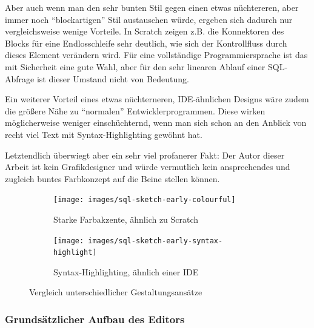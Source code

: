 
Aber auch wenn man den sehr bunten Stil gegen einen etwas nüchtereren, aber immer noch ``blockartigen'' Stil austauschen würde, ergeben sich dadurch nur vergleichsweise wenige Vorteile. In Scratch zeigen z.B. die Konnektoren des Blocks für eine Endlosschleife sehr deutlich, wie sich der Kontrollfluss durch dieses Element verändern wird. Für eine vollständige Programmiersprache ist das mit Sicherheit eine gute Wahl, aber für den sehr linearen Ablauf einer SQL-Abfrage ist dieser Umstand nicht von Bedeutung.

Ein weiterer Vorteil eines etwas nüchterneren, IDE-ähnlichen Designs wäre zudem die größere Nähe zu ``normalen'' Entwicklerprogrammen. Diese wirken möglicherweise weniger einschüchternd, wenn man sich schon an den Anblick von recht viel Text mit Syntax-Highlighting gewöhnt hat.

Letztendlich überwiegt aber ein sehr viel profanerer Fakt: Der Autor dieser Arbeit ist kein Grafikdesigner und würde vermutlich kein ansprechendes und zugleich buntes Farbkonzept auf die Beine stellen können.

\begin{figure}
  \begin{subfigure}[b]{0.45\textwidth}
    \texttt{[image: images/sql-sketch-early-colourful]}
    \caption{Starke Farbakzente, ähnlich zu Scratch}
    \label{fig:screen-sql-editor-early-colourful}
  \end{subfigure}\hfill
  \begin{subfigure}[b]{0.45\textwidth}
    \texttt{[image: images/sql-sketch-early-syntax-highlight]}
    \caption{Syntax-Highlighting, ähnlich einer IDE}
    \label{fig:screen-sql-editor-early-syntax-highlighting}
  \end{subfigure}
  \caption{Vergleich unterschiedlicher Gestaltungsansätze}
  \label{fig:compare-colourful}
\end{figure}

\subsubsection{Grundsätzlicher Aufbau des Editors}

